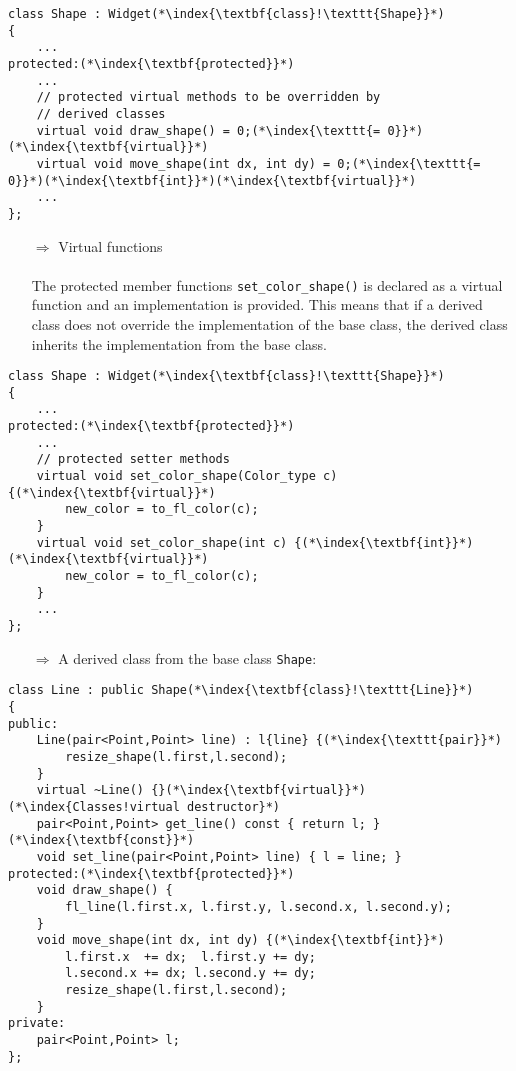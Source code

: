 \documentclass[10pt]{article}
\begin{document}
\begin{lstlisting}
class Shape : Widget(*\index{\textbf{class}!\texttt{Shape}}*)
{
    ...
protected:(*\index{\textbf{protected}}*)
    ...
    // protected virtual methods to be overridden by 
    // derived classes
    virtual void draw_shape() = 0;(*\index{\texttt{= 0}}*)(*\index{\textbf{virtual}}*)
    virtual void move_shape(int dx, int dy) = 0;(*\index{\texttt{= 0}}*)(*\index{\textbf{int}}*)(*\index{\textbf{virtual}}*)
    ...
};
\end{lstlisting}
\begin{enumerate}
\item[$\Rightarrow$] Virtual functions\\ \\ The protected member functions \texttt{set\_color\_shape()} is declared as a virtual function and an implementation is provided. This means that if a derived class does not override the implementation of the base class, the derived class inherits the implementation from the base class.
\end{enumerate}
\begin{lstlisting}
class Shape : Widget(*\index{\textbf{class}!\texttt{Shape}}*)
{
    ...
protected:(*\index{\textbf{protected}}*)
    ...
    // protected setter methods
    virtual void set_color_shape(Color_type c) {(*\index{\textbf{virtual}}*)
        new_color = to_fl_color(c);
    }
    virtual void set_color_shape(int c) {(*\index{\textbf{int}}*)(*\index{\textbf{virtual}}*)
        new_color = to_fl_color(c);
    }
    ...
};
\end{lstlisting}
\begin{enumerate}
\item[$\Rightarrow$] A derived class from the base class \texttt{Shape}:
\end{enumerate}
\begin{lstlisting}
class Line : public Shape(*\index{\textbf{class}!\texttt{Line}}*)
{
public:
    Line(pair<Point,Point> line) : l{line} {(*\index{\texttt{pair}}*)
        resize_shape(l.first,l.second);
    }
    virtual ~Line() {}(*\index{\textbf{virtual}}*)(*\index{Classes!virtual destructor}*)
    pair<Point,Point> get_line() const { return l; }(*\index{\textbf{const}}*)
    void set_line(pair<Point,Point> line) { l = line; }
protected:(*\index{\textbf{protected}}*)
    void draw_shape() {
        fl_line(l.first.x, l.first.y, l.second.x, l.second.y);
    }
    void move_shape(int dx, int dy) {(*\index{\textbf{int}}*)
        l.first.x  += dx;  l.first.y += dy;
        l.second.x += dx; l.second.y += dy;
        resize_shape(l.first,l.second);
    }
private:
    pair<Point,Point> l;
};
\end{lstlisting}
\end{document}
